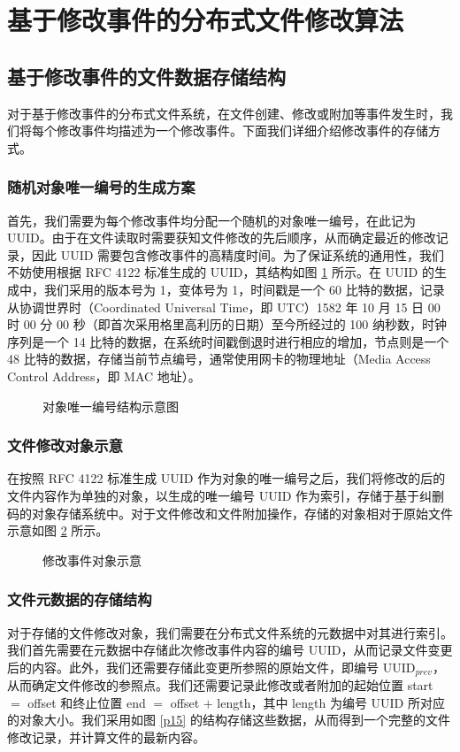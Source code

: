 \section{基于修改事件的分布式文件修改算法}
\subsection{基于修改事件的文件数据存储结构}
对于基于修改事件的分布式文件系统，在文件创建、修改或附加等事件发生时，我们将每个修改事件均描述为一个修改事件。下面我们详细介绍修改事件的存储方式。
\subsubsection{随机对象唯一编号的生成方案}
首先，我们需要为每个修改事件均分配一个随机的对象唯一编号，在此记为 UUID。由于在文件读取时需要获知文件修改的先后顺序，从而确定最近的修改记录，因此 UUID 需要包含修改事件的高精度时间。为了保证系统的通用性，我们不妨使用根据 RFC 4122 标准生成的 UUID，其结构如图 \ref{p16} 所示。在 UUID 的生成中，我们采用的版本号为 1，变体号为 1，时间戳是一个 60 比特的数据，记录从协调世界时（Coordinated Universal Time，即 UTC）1582 年 10 月 15 日 00 时 00 分 00 秒（即首次采用格里高利历的日期）至今所经过的 100 纳秒数，时钟序列是一个 14 比特的数据，在系统时间戳倒退时进行相应的增加，节点则是一个 48 比特的数据，存储当前节点编号，通常使用网卡的物理地址（Media Access Control Address，即 MAC 地址）。

\begin{figure}[!htb]
\centering
\resizebox{.8\textwidth}{!}{}
\caption{对象唯一编号结构示意图}
\label{p16}
\end{figure}
\subsubsection{文件修改对象示意}
在按照 RFC 4122 标准生成 UUID 作为对象的唯一编号之后，我们将修改的后的文件内容作为单独的对象，以生成的唯一编号 UUID 作为索引，存储于基于纠删码的对象存储系统中。对于文件修改和文件附加操作，存储的对象相对于原始文件示意如图 \ref{p4} 所示。

\begin{figure}[!htb]
\centering
\resizebox{.8\textwidth}{!}{}
\caption{修改事件对象示意}
\label{p4}
\end{figure}
\subsubsection{文件元数据的存储结构}
对于存储的文件修改对象，我们需要在分布式文件系统的元数据中对其进行索引。我们首先需要在元数据中存储此次修改事件内容的编号 UUID，从而记录文件变更后的内容。此外，我们还需要存储此变更所参照的原始文件，即编号 UUID$_{prev}$，从而确定文件修改的参照点。我们还需要记录此修改或者附加的起始位置 start $=$ offset 和终止位置 end $=$ offset $+$ length，其中 length 为编号 UUID 所对应的对象大小。我们采用如图 \ref{p15} 的结构存储这些数据，从而得到一个完整的文件修改记录，并计算文件的最新内容。

